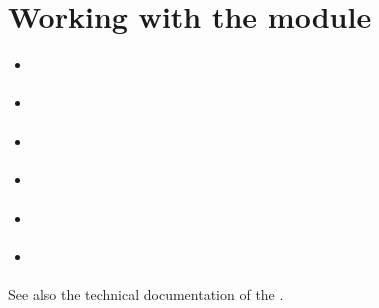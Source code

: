 \documentclass[a4paper,12pt,english]{sphinxhowto}
\begin{document}
\section{Working with the  module}
\label{\detokenize{tutorial:working-with-the-graphs-module}}\label{\detokenize{tutorial:graphs-tutorial-label}}
\begin{sphinxShadowBox}
\begin{itemize}
\item {} 
\label{\detokenize{tutorial:id214}}{\hyperref[\detokenize{tutorial:structure-of-a-graph-object}]{}}

\item {} 
\label{\detokenize{tutorial:id215}}{\hyperref[\detokenize{tutorial:q-coloring-of-a-graph}]{}}

\item {} 
\label{\detokenize{tutorial:id216}}{\hyperref[\detokenize{tutorial:mis-and-clique-enumeration}]{}}

\item {} 
\label{\detokenize{tutorial:id217}}{\hyperref[\detokenize{tutorial:line-graphs-and-maximal-matchings}]{}}

\item {} 
\label{\detokenize{tutorial:id218}}{\hyperref[\detokenize{tutorial:grids-and-the-ising-model}]{}}

\item {} 
\label{\detokenize{tutorial:id219}}{\hyperref[\detokenize{tutorial:simulating-metropolis-random-walks}]{}}

\end{itemize}
\end{sphinxShadowBox}

See also the technical documentation of the .
\end{document}
